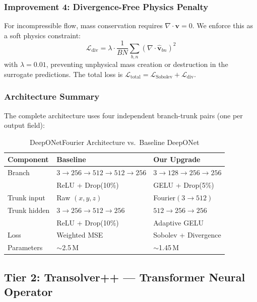 \documentclass[conference]{IEEEtran}
\begin{document}
\subsubsection{Improvement 4: Divergence-Free Physics Penalty}
For incompressible flow, mass conservation requires $\nabla \cdot \bm{v} = 0$. We enforce this as a soft physics constraint:
\begin{equation}
\mathcal{L}_\text{div} = \lambda \cdot \frac{1}{BN}\sum_{b,n}\left(\nabla \cdot \hat{\bm{v}}_{bn}\right)^2
\label{eq:div}
\end{equation}
with $\lambda = 0.01$, preventing unphysical mass creation or destruction in the surrogate predictions. The total loss is $\mathcal{L}_\text{total} = \mathcal{L}_\text{Sobolev} + \mathcal{L}_\text{div}$.

\subsubsection{Architecture Summary}
The complete architecture uses four independent branch-trunk pairs (one per output field):

\begin{table}[htbp]
\caption{DeepONetFourier Architecture vs.\ Baseline DeepONet}
\label{tab:arch}
\centering
\begin{tabular}{lll}
\toprule
\textbf{Component} & \textbf{Baseline} & \textbf{Our Upgrade} \\
\midrule
Branch & $3{\to}256{\to}512{\to}512{\to}256$ & $3{\to}128{\to}256{\to}256$ \\
 & ReLU + Drop(10\%) & GELU + Drop(5\%) \\
\midrule
Trunk input & Raw $(x,y,z)$ & Fourier$(3{\to}512)$ \\
Trunk hidden & $3{\to}256{\to}512{\to}256$ & $512{\to}256{\to}256$ \\
 & ReLU + Drop(10\%) & Adaptive GELU \\
\midrule
Loss & Weighted MSE & Sobolev + Divergence \\
Parameters & $\sim$2.5\,M & $\sim$1.45\,M \\
\bottomrule
\end{tabular}
\end{table}

\subsection{Tier 2: Transolver++ --- Transformer Neural Operator}
\label{sec:transolver}
\end{document}
